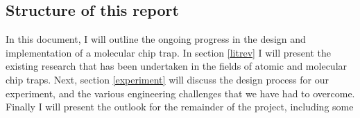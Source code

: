 \subsection{Structure of this report}

In this document, I will outline the ongoing progress in the design and
implementation of a molecular chip trap. In section \ref{litrev} I will present
the existing research that has been undertaken in the fields of atomic and
molecular chip traps. Next, section \ref{experiment} will discuss the design
process for our experiment, and the various engineering challenges that we have
had to overcome. Finally I will present the outlook for the remainder of the
project, including some 
